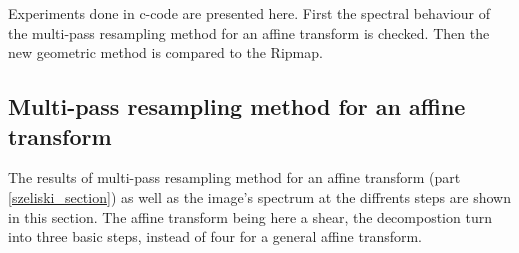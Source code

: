 	Experiments done in c-code are presented here. First the spectral behaviour of the multi-pass resampling method for an affine transform is checked. Then the new geometric method is compared to the Ripmap.


\subsection{Multi-pass resampling method for an affine transform}

 
 
 The results of multi-pass resampling method for an affine transform \cite{szeliski2010high} (part \ref{szeliski_section}) as well as the image's spectrum at the diffrents steps are shown in this section. The affine transform being here a shear, the decompostion turn into three basic steps, instead of four for a general affine transform.  
 
